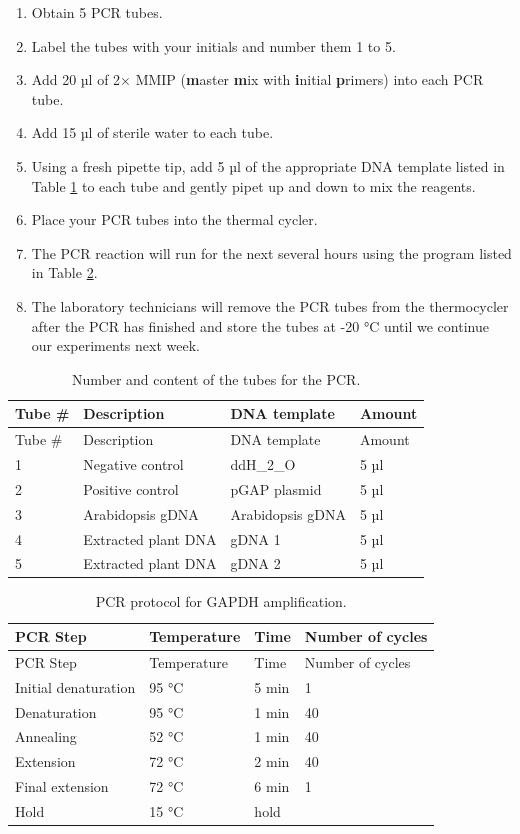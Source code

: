 \documentclass[]{book}
\providecommand{\tightlist}{%
  \setlength{\itemsep}{0pt}\setlength{\parskip}{0pt}}
\begin{document}
\begin{enumerate}
\def\labelenumi{\arabic{enumi}.}
\tightlist
\item
  Obtain 5 PCR tubes.
\item
  Label the tubes with your initials and number them 1 to 5.
\item
  Add 20 µl of 2× MMIP (\textbf{m}aster \textbf{m}ix with \textbf{i}nitial \textbf{p}rimers) into each PCR tube.
\item
  Add 15 µl of sterile water to each tube.
\item
  Using a fresh pipette tip, add 5 µl of the appropriate DNA template listed in Table \ref{tab:tubes} to each tube and gently pipet up and down to mix the reagents.
\item
  Place your PCR tubes into the thermal cycler.
\item
  The PCR reaction will run for the next several hours using the program listed in Table \ref{tab:pcr}.
\item
  The laboratory technicians will remove the PCR tubes from the thermocycler after the PCR has finished and store the tubes at -20 °C until we continue our experiments next week.
\end{enumerate}

\begin{longtable}[]{@{}llll@{}}
\caption{\label{tab:tubes} Number and content of the tubes for the PCR.}\tabularnewline
\toprule
Tube \# & Description & DNA template & Amount\tabularnewline
\midrule
\endfirsthead
\toprule
Tube \# & Description & DNA template & Amount\tabularnewline
\midrule
\endhead
1 & Negative control & ddH\_2\_O & 5 µl\tabularnewline
2 & Positive control & pGAP plasmid & 5 µl\tabularnewline
3 & Arabidopsis gDNA & Arabidopsis gDNA & 5 µl\tabularnewline
4 & Extracted plant DNA & gDNA 1 & 5 µl\tabularnewline
5 & Extracted plant DNA & gDNA 2 & 5 µl\tabularnewline
\bottomrule
\end{longtable}

\begin{longtable}[]{@{}llll@{}}
\caption{\label{tab:pcr} PCR protocol for GAPDH amplification.}\tabularnewline
\toprule
PCR Step & Temperature & Time & Number of cycles\tabularnewline
\midrule
\endfirsthead
\toprule
PCR Step & Temperature & Time & Number of cycles\tabularnewline
\midrule
\endhead
Initial denaturation & 95 °C & 5 min & 1\tabularnewline
Denaturation & 95 °C & 1 min & 40\tabularnewline
Annealing & 52 °C & 1 min & 40\tabularnewline
Extension & 72 °C & 2 min & 40\tabularnewline
Final extension & 72 °C & 6 min & 1\tabularnewline
Hold & 15 °C & hold &\tabularnewline
\bottomrule
\end{longtable}
\end{document}
